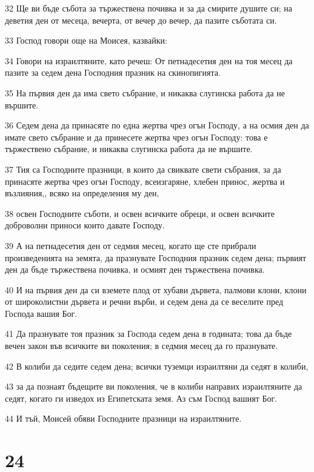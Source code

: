 \par 32 Ще ви бъде събота за тържествена почивка и за да смирите душите си; на деветия ден от месеца, вечерта, от вечер до вечер, да пазите съботата си.
\par 33 Господ говори още на Моисея, казвайки:
\par 34 Говори на израилтяните, като речеш: От петнадесетия ден на тоя месец да пазите за седем дена Господния празник на скинопигията.
\par 35 На първия ден да има свето събрание, и никаква слугинска работа да не вършите.
\par 36 Седем дена да принасяте по една жертва чрез огън Господу, а на осмия ден да имате свето събрание и да принесете жертва чрез огън Господу: това е тържествено събрание, и никаква слугинска работа да не вършите.
\par 37 Тия са Господните празници, в които да свиквате свети събрания, за да принасяте жертва чрез огън Господу, всеизгаряне, хлебен принос, жертва и възлияния,, всяко на определения му ден,
\par 38 освен Господните съботи, и освен всичките обреци, и освен всичките доброволни приноси които давате Господу.
\par 39 А на петнадесетия ден от седмия месец, когато ще сте прибрали произведенията на земята, да празнувате Господния празник седем дена; първият ден да бъде тържествена почивка, и осмият ден тържествена почивка.
\par 40 И на първия ден да си вземете плод от хубави дървета, палмови клони, клони от широколистни дървета и речни върби, и седем дена да се веселите пред Господа вашия Бог.
\par 41 Да празнувате тоя празник за Господа седем дена в годината; това да бъде вечен закон във всичките ви поколения; в седмия месец да го празнувате.
\par 42 В колиби да седите седем дена; всички туземци израилтяни да седят в колиби,
\par 43 за да познаят бъдещите ви поколения, че в колиби направих израилтяните да седят, когато ги изведох из Египетската земя. Аз съм Господ вашият Бог.
\par 44 И тъй, Моисей обяви Господните празници на израилтяните.

\chapter{24}

